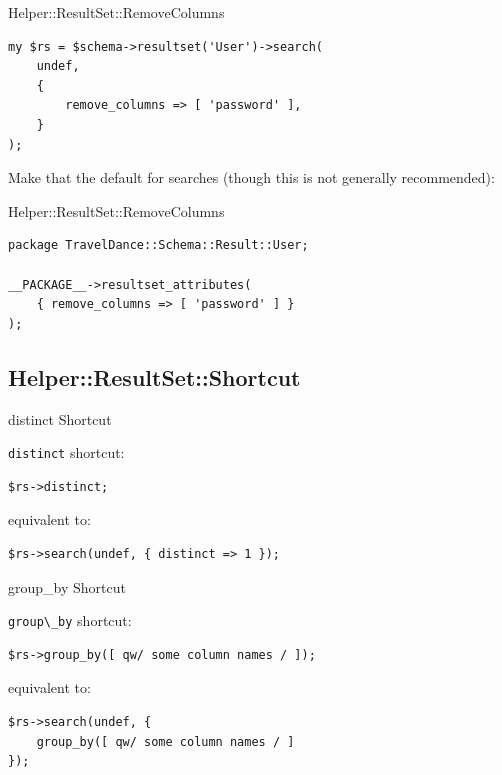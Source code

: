 \begin{frame}[fragile]{Helper::ResultSet::RemoveColumns}
\begin{lstlisting}
my $rs = $schema->resultset('User')->search(
    undef,
    {
        remove_columns => [ 'password' ],
    }
);
\end{lstlisting}
\end{frame}

Make that the default for searches (though this is not generally recommended):

\begin{frame}[fragile]{Helper::ResultSet::RemoveColumns}
\begin{lstlisting}
package TravelDance::Schema::Result::User;

__PACKAGE__->resultset_attributes(
    { remove_columns => [ 'password' ] }
);
\end{lstlisting}
\end{frame}

\subsection{Helper::ResultSet::Shortcut}

\begin{frame}[fragile]{distinct Shortcut}

\verb|distinct| shortcut:

\begin{lstlisting}
$rs->distinct;
\end{lstlisting}

equivalent to:

\begin{lstlisting}
$rs->search(undef, { distinct => 1 });
\end{lstlisting}
\end{frame}

\begin{frame}[fragile]{group\_by Shortcut}

\verb|group\_by| shortcut:

\begin{lstlisting}
$rs->group_by([ qw/ some column names / ]);
\end{lstlisting}

equivalent to:

\begin{lstlisting}
$rs->search(undef, { 
    group_by([ qw/ some column names / ] 
});
\end{lstlisting}
\end{frame}

